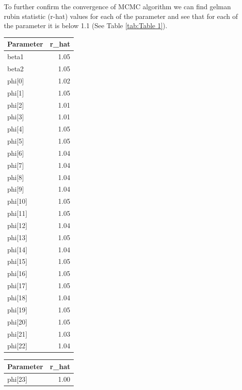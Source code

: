 \documentclass[enabledeprecatedfontcommands,parskip=half,twoside=semi,BCOR=0mm]{scrreprt}
\numberwithin{equation}{chapter}
\theoremstyle{definition}
\theoremstyle{remark}
\begin{document}
    To further confirm the convergence of MCMC algorithm we can find gelman rubin statistic (r-hat) values for each of the parameter and see that for each of the parameter it is below 1.1 (See Table \ref{tab:Table 1}).
    \begin{table}[h!]
    \centering
    \begin{adjustbox}{max width=\textwidth}
    \begin{minipage}{0.48\textwidth}
    \centering
    \begin{tabular}{l r}
    \textbf{Parameter} & \textbf{r\_hat} \\
    \hline
    beta1 & 1.05 \\
    beta2 & 1.05 \\
    phi[0] & 1.02 \\
    phi[1] & 1.05 \\
    phi[2] & 1.01 \\
    phi[3] & 1.01 \\
    phi[4] & 1.05 \\
    phi[5] & 1.05 \\
    phi[6] & 1.04 \\
    phi[7] & 1.04 \\
    phi[8] & 1.04 \\
    phi[9] & 1.04 \\
    phi[10] & 1.05 \\
    phi[11] & 1.05 \\
    phi[12] & 1.04 \\
    phi[13] & 1.05 \\
    phi[14] & 1.04 \\
    phi[15] & 1.05 \\
    phi[16] & 1.05 \\
    phi[17] & 1.05 \\
    phi[18] & 1.04 \\
    phi[19] & 1.05 \\
    phi[20] & 1.05 \\
    phi[21] & 1.03 \\
    phi[22] & 1.04 \\
    \end{tabular}
    \end{minipage}
    \hfill
    \begin{minipage}{0.48\textwidth}
    \centering
    \begin{tabular}{l r}
    \textbf{Parameter} & \textbf{r\_hat} \\
    \hline
    phi[23] & 1.00 \\

\end{tabular}
\end{minipage}
\end{adjustbox}
\end{table}
\end{document}
